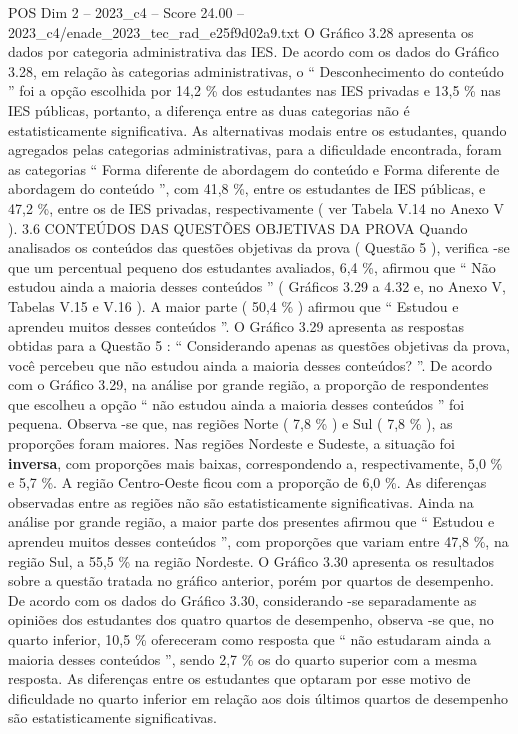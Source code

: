 \begin{textsample}{POS Dim 2 – 2023\_c4 – Score 24.00 – 2023\_c4/enade\_2023\_tec\_rad\_e25f9d02a9.txt}
O Gráfico 3.28 apresenta os dados por categoria administrativa das IES.
De acordo com os dados do Gráfico 3.28, em relação às categorias administrativas, o “ Desconhecimento do conteúdo ” foi a opção escolhida por 14,2 \% dos estudantes nas IES privadas e 13,5 \% nas IES públicas, portanto, a diferença entre as duas categorias não é estatisticamente significativa.
As alternativas modais entre os estudantes, quando agregados pelas categorias administrativas, para a dificuldade encontrada, foram as categorias “ Forma diferente de abordagem do conteúdo e Forma diferente de abordagem do conteúdo ”, com 41,8 \%, entre os estudantes de IES públicas, e 47,2 \%, entre os de IES privadas, respectivamente ( ver Tabela V.14 no Anexo V ). 3.6 CONTEÚDOS DAS QUESTÕES OBJETIVAS DA PROVA Quando analisados os conteúdos das questões objetivas da prova ( Questão 5 ), verifica -se que um percentual pequeno dos estudantes avaliados, 6,4 \%, afirmou que “ Não estudou ainda a maioria desses conteúdos ” ( Gráficos 3.29 a 4.32 e, no Anexo V, Tabelas V.15 e V.16 ).
A maior parte ( 50,4 \% ) afirmou que “ Estudou e aprendeu muitos desses conteúdos ”.
O Gráfico 3.29 apresenta as respostas obtidas para a Questão 5 : “ Considerando apenas as questões objetivas da prova, você percebeu que não estudou ainda a maioria desses conteúdos? ”.
De acordo com o Gráfico 3.29, na análise por grande região, a proporção de respondentes que escolheu a opção “ não estudou ainda a maioria desses conteúdos ” foi pequena.
Observa -se que, nas regiões Norte ( 7,8 \% ) e Sul ( 7,8 \% ), as proporções foram maiores.
Nas regiões Nordeste e Sudeste, a situação foi \textbf{inversa}, com proporções mais baixas, correspondendo a, respectivamente, 5,0 \% e 5,7 \%.
A região Centro-Oeste ficou com a proporção de 6,0 \%.
As diferenças observadas entre as regiões não são estatisticamente significativas.
Ainda na análise por grande região, a maior parte dos presentes afirmou que “ Estudou e aprendeu muitos desses conteúdos ”, com proporções que variam entre 47,8 \%, na região Sul, a 55,5 \% na região Nordeste.
O Gráfico 3.30 apresenta os resultados sobre a questão tratada no gráfico anterior, porém por quartos de desempenho.
De acordo com os dados do Gráfico 3.30, considerando -se separadamente as opiniões dos estudantes dos quatro quartos de desempenho, observa -se que, no quarto inferior, 10,5 \% ofereceram como resposta que “ não estudaram ainda a maioria desses conteúdos ”, sendo 2,7 \% os do quarto superior com a mesma resposta.
As diferenças entre os estudantes que optaram por esse motivo de dificuldade no quarto inferior em relação aos dois últimos quartos de desempenho são estatisticamente significativas.

\end{textsample}
